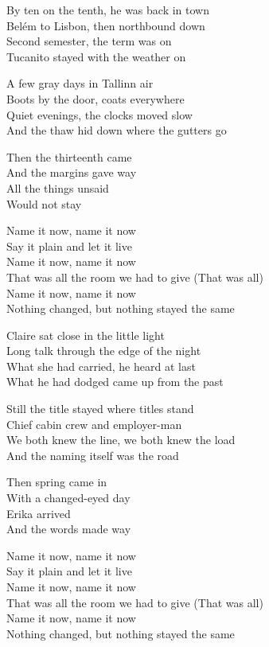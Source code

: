 \begin{lyrics}
By ten on the tenth, he was back in town\\
Belém to Lisbon, then northbound down\\
Second semester, the term was on\\
Tucanito stayed with the weather on

A few gray days in Tallinn air\\
Boots by the door, coats everywhere\\
Quiet evenings, the clocks moved slow\\
And the thaw hid down where the gutters go

Then the thirteenth came\\
And the margins gave way\\
All the things unsaid\\
Would not stay

Name it now, name it now\\
Say it plain and let it live\\
Name it now, name it now\\
That was all the room we had to give
(That was all)\\
Name it now, name it now\\
Nothing changed, but nothing stayed the same

Claire sat close in the little light\\
Long talk through the edge of the night\\
What she had carried, he heard at last\\
What he had dodged came up from the past

Still the title stayed where titles stand\\
Chief cabin crew and employer-man\\
We both knew the line, we both knew the load\\
And the naming itself was the road

Then spring came in\\
With a changed-eyed day\\
Erika arrived\\
And the words made way

Name it now, name it now\\
Say it plain and let it live\\
Name it now, name it now\\
That was all the room we had to give
(That was all)\\
Name it now, name it now\\
Nothing changed, but nothing stayed the same


\end{lyrics}
